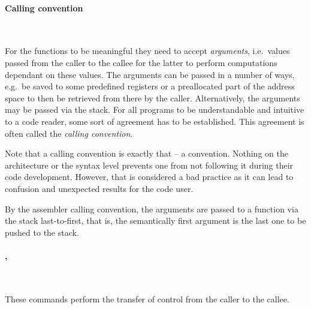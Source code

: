 \vspace{-0.35cm}

\paragraph{Calling convention}\

For the functions to be meaningful they need to accept \textit{arguments},
i.e.\ values passed from the caller to the callee for the latter to perform
computations dependant on these values.
The arguments can be passed in a number of ways, e.g.\ be saved to some
predefined registers or a preallocated part of the address space to then
be retrieved from there by the caller.
Alternatively, the arguments may be passed via the stack.
For all programs to be understandable and intuitive to a code reader,
some sort of agreement has to be established.
This agreement is often called the \textit{calling convention}.

Note that a calling convention is exactly that -- a convention.
Nothing on the architecture or the syntax level prevents one from not following
it during their code development.
However, that is considered a bad practice as it can lead to confusion and
unexpected results for the code user.

By the  assembler calling convention, the arguments are passed to
a function via the stack last-to-first, that is, the semantically first argument
is the last one to be pushed to the stack.

\vspace{-0.35cm}

\paragraph{, }\

These commands perform the transfer of control from the caller to the callee.

